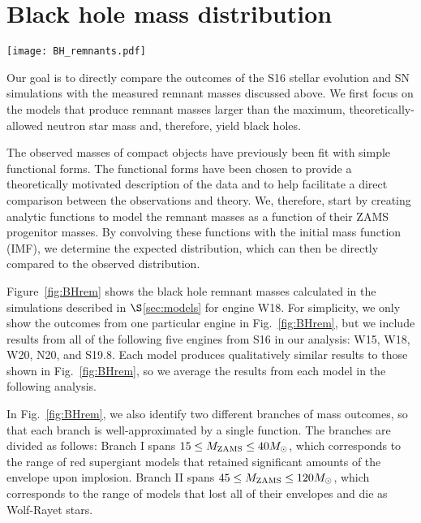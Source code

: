\documentclass[]{emulateapj}
\newcommand{\Ms}{M_{\odot}}
\newcommand{\Mz}{M_{\rm ZAMS}}
\begin{document}
\section{Black hole mass distribution}
\label{sec:BHdist}
\begin{figure*}[ht]
\centering
\texttt{[image: BH\_remnants.pdf]}
\caption{\label{fig:BHrem} Same as Fig.~\ref{fig:allrem}, but only showing the implosion black holes. Solid diamonds indicate black holes that are formed from the collapse of only the He- or CO-core; open circles indicate black holes formed from the collapse of the entire star. We also label the two progenitor mass ranges, across which we fit the black hole masses with analytic functions. We show the fits to the remnants of implosions in which the entire star collapsed and in which only the core collapsed in orange dashed and green solid lines, respectively. }
\end{figure*}

Our goal is to directly compare the outcomes of the S16 stellar evolution and SN simulations with the measured remnant masses discussed above. We first focus on the models that produce remnant masses larger than the maximum, theoretically-allowed neutron star mass and, therefore, yield black holes.

The observed masses of compact objects have previously been fit with simple functional forms. The functional forms have been chosen to provide a theoretically motivated description of the data and to help facilitate a direct comparison between the observations and theory. We, therefore, start by creating analytic functions to model the remnant masses as a function of their ZAMS progenitor masses. By convolving these functions with the initial mass function (IMF), we determine the expected distribution, which can then be directly compared to the observed distribution.

Figure~\ref{fig:BHrem} shows the black hole remnant masses calculated in the simulations described in $\S$\ref{sec:models} for engine W18. For simplicity, we only show the outcomes from one particular engine in Fig.~\ref{fig:BHrem}, but we include results from all of the following five engines from S16 in our analysis:  W15, W18, W20, N20, and S19.8. Each model produces qualitatively similar results to those shown in Fig.~\ref{fig:BHrem}, so we average the results from each model in the following analysis.

In Fig.~\ref{fig:BHrem}, we also identify two different branches of mass outcomes, so that each branch is well-approximated by a single function. The branches are divided as follows: Branch I spans $15 \le \Mz \le 40 \Ms$, which corresponds to the range of red supergiant models that retained significant amounts of the envelope upon implosion. Branch II spans $45 \le \Mz \le 120 \Ms$, which corresponds to the range of models that lost all of their envelopes and die as Wolf-Rayet stars.
\end{document}
